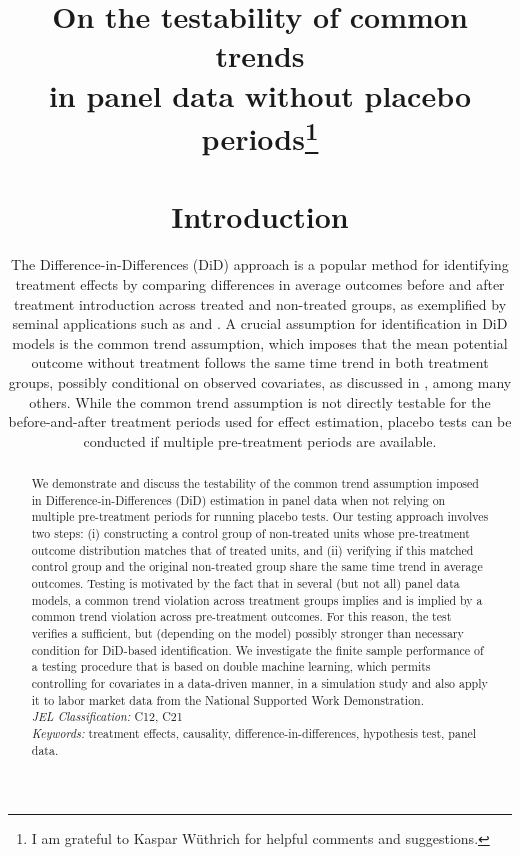 
\title{On the testability of common trends\\in panel data without placebo periods\thanks{I am grateful to Kaspar W\"uthrich for helpful comments and suggestions.}
\maketitle
	
	\begin{abstract}
		We demonstrate and discuss the testability of the common trend assumption imposed in Difference-in-Differences (DiD) estimation
		in panel data when not relying on multiple pre-treatment periods for running placebo tests. Our testing approach involves two steps: (i) constructing a control group of non-treated units whose pre-treatment outcome distribution matches that of treated units, and (ii) verifying if this matched control group and the original non-treated group share the same time trend in average outcomes. Testing is motivated by the fact that in several (but not all) panel data models, a common trend violation across treatment groups implies and is implied by a common trend violation across pre-treatment outcomes. For this reason, the test verifies a sufficient, but (depending on the model) possibly stronger than necessary condition for DiD-based identification. We investigate the finite sample performance of a testing procedure that is based on double machine learning, which permits controlling for covariates in a data-driven manner, in a simulation study and also apply it to labor market data from the National Supported Work Demonstration.\\[0.5cm]
		{\it JEL Classification:} C12, C21 \\[0.1cm]
		{\it Keywords:} treatment effects, causality, difference-in-differences, hypothesis test, panel data.
	\end{abstract}
	\bigskip
	
	
	
	\thispagestyle{empty}
	\newpage
	\setcounter{page}{1}
	
	
	
	\section{Introduction}
	
	
	The Difference-in-Differences (DiD) approach is a popular method for identifying treatment effects by comparing differences in average outcomes before and after treatment introduction across treated and non-treated groups, as exemplified by seminal applications such as \cite{Snow1855} and \cite{Ashenfelter78}. A crucial assumption for identification in DiD models is the common trend assumption, which imposes that the mean potential outcome without treatment follows the same time trend in both treatment groups, possibly conditional on observed covariates, as discussed in \cite{Abadie2005}, among many others. While the common trend assumption is not directly testable for the before-and-after treatment periods used for effect estimation, placebo tests can be conducted if multiple pre-treatment periods are available.
	
}
